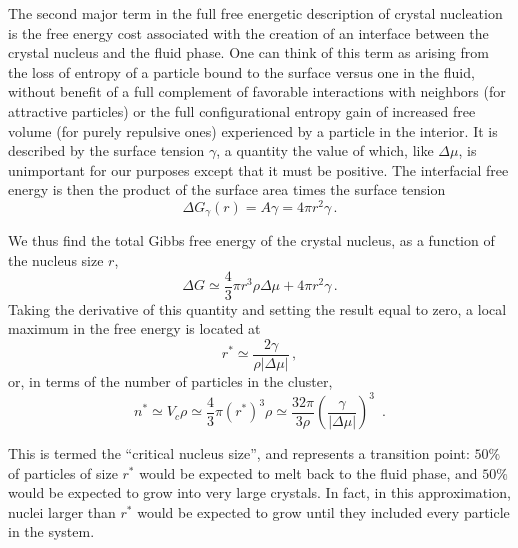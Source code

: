 
The second major term in the full free energetic description of crystal nucleation is the free energy cost associated with the creation of an interface between the crystal nucleus and the fluid phase.
One can think of this term as arising from the loss of entropy of a particle bound to the surface versus one in the fluid, without benefit of a full complement of favorable interactions with neighbors (for attractive particles) or the full configurational entropy gain of increased free volume (for purely repulsive ones) experienced by a particle in the interior.
It is described by the surface tension $\gamma$, a quantity the value of which, like $\Delta \mu$, is unimportant for our purposes except that it must be positive.
The interfacial free energy is then the product of the surface area times the surface tension
\begin{equation}\Delta G_{\gamma} (r) = A \gamma = 4 \pi r^2 \gamma \,.\end{equation}

We thus find the total Gibbs free energy of the crystal nucleus, as a function of the nucleus size $r$,
\begin{equation}\Delta G \simeq \frac{4}{3} \pi r^3 \rho \Delta \mu + 4 \pi r^2 \gamma \,.\end{equation}
Taking the derivative of this quantity and setting the result equal to zero, a local maximum in the free energy is located at
\begin{equation}r^* \simeq \frac{2 \gamma}{\rho \left|\Delta \mu \right|} \,,\end{equation}
or, in terms of the number of particles in the cluster,
\begin{equation}n^* \simeq V_c \rho \simeq \frac{4}{3} \pi \left(r^*\right)^3 \rho \simeq \frac{32 \pi}{3 \rho}\left(\frac{\gamma}{\left|\Delta \mu\right|}\right)^3\,\,\,.\end{equation}

This is termed the ``critical nucleus size'', and represents a transition point: $50\%$ of particles of size $r^*$ would be expected to melt back to the fluid phase, and $50\%$ would be expected to grow into very large crystals.
In fact, in this approximation, nuclei larger than $r^*$ would be expected to grow until they included every particle in the system.

